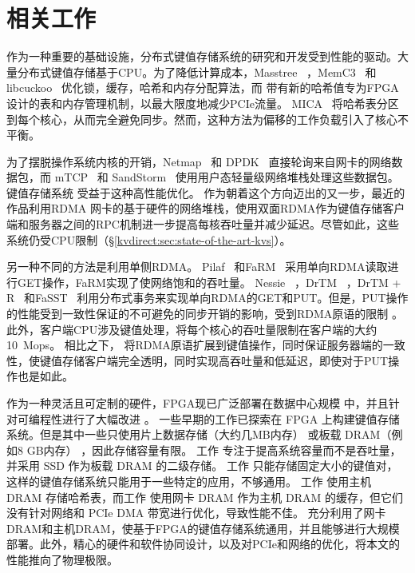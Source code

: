 \section{相关工作}
\label{kvdirect:sec:related}

作为一种重要的基础设施，分布式键值存储系统的研究和开发受到性能的驱动。大量分布式键值存储基于CPU。为了降低计算成本，Masstree~ \cite {mao2012cache}，MemC3~ \cite {fan2013memc3}和libcuckoo~ \cite {li2014algorithmic}优化锁，缓存，哈希和内存分配算法，而 \oursys{} 带有新的哈希值专为FPGA设计的表和内存管理机制，以最大限度地减少PCIe流量。 MICA~ \cite {lim2014mica}将哈希表分区到每个核心，从而完全避免同步。然而，这种方法为偏移的工作负载引入了核心不平衡。

为了摆脱操作系统内核的开销，Netmap~\cite {rizzo2012netmap} 和 DPDK~\cite{intel2014data} 直接轮询来自网卡的网络数据包，而 mTCP~\cite {jeong2014mtcp} 和  SandStorm~\cite{marinos2014network} 使用用户态轻量级网络堆栈处理这些数据包。
键值存储系统 \cite {kapoor2012chronos,ousterhout2010case,ousterhout2015ramcloud,lim2014mica,li2016full}受益于这种高性能优化。
作为朝着这个方向迈出的又一步，最近的作品\cite {infiniband2000infiniband,kalia2014using,kalia2016design,kalia2014using,kalia2016design}利用RDMA 网卡的基于硬件的网络堆栈，使用双面RDMA作为键值存储客户端和服务器之间的RPC机制进一步提高每核吞吐量并减少延迟。尽管如此，这些系统仍受CPU限制（\S \ref {kvdirect:sec:state-of-the-art-kvs}）。

另一种不同的方法是利用单侧RDMA。 Pilaf~ \cite {mitchell2013using}和FaRM~ \cite {dragojevic2014farm}采用单向RDMA读取进行GET操作，FaRM实现了使网络饱和的吞吐量。 Nessie~ \cite {szepesi2014designing}，DrTM~ \cite {wei2015fast}，DrTM + R~ \cite {chen2016fast}和FaSST~ \cite {kalia2016fasst}利用分布式事务来实现单向RDMA的GET和PUT。但是，PUT操作的性能受到一致性保证的不可避免的同步开销的影响，受到RDMA原语的限制 \cite {kalia2016design}。此外，客户端CPU涉及键值处理，将每个核心的吞吐量限制在客户端的大约10~Mops。
相比之下，\oursys{} 将RDMA原语扩展到键值操作，同时保证服务器端的一致性，使键值存储客户端完全透明，同时实现高吞吐量和低延迟，即使对于PUT操作也是如此。

作为一种灵活且可定制的硬件，FPGA现已广泛部署在数据中心规模 \cite {putnam2014reconfigurable,caulfield2016cloud}中，并且针对可编程性进行了大幅改进 \cite {bacon2013fpga,li2016clicknp}。
一些早期的工作已探索在 FPGA 上构建键值存储系统。但是其中一些只使用片上数据存储（大约几MB内存） \cite {liang16fpl} 或板载 DRAM（例如8 GB内存） \cite {istvan2013flexible,chalamalasetti2013fpga,istvan2015hash}，因此存储容量有限。
工作 \cite {blott2015scaling} 专注于提高系统容量而不是吞吐量，并采用 SSD 作为板载 DRAM 的二级存储。
工作 \cite {liang16fpl,chalamalasetti2013fpga} 只能存储固定大小的键值对，这样的键值存储系统只能用于一些特定的应用，不够通用。
工作 \cite {blott13hotcloud,lavasani2014fpga} 使用主机 DRAM 存储哈希表，而工作 \cite {tokusashi2016multilevel} 使用网卡 DRAM 作为主机 DRAM 的缓存，但它们没有针对网络和 PCIe DMA 带宽进行优化，导致性能不佳。
\oursys{} 充分利用了网卡 DRAM和主机DRAM，使基于FPGA的键值存储系统通用，并且能够进行大规模部署。此外，精心的硬件和软件协同设计，以及对PCIe和网络的优化，将本文的性能推向了物理极限。

